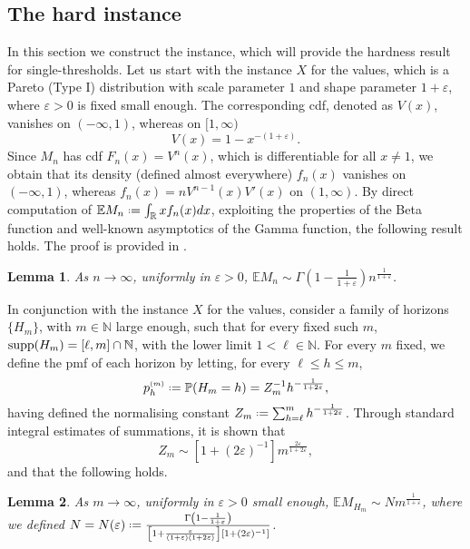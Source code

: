 \documentclass[11pt, a4paper, twoside]{article}
\newcommand*{\defeq}{\mathrel{\vcenter{\baselineskip0.5ex \lineskiplimit0pt
			\hbox{\scriptsize.}\hbox{\scriptsize.}}}=}
\newcommand{\ssup}[1]{{\scriptscriptstyle{({#1})}}}
\newcommand{\eps}{\varepsilon}
\newcommand{\NN}{\mathbb{N}}
\newcommand{\RR}{\mathbb{R}}
\newcommand{\EE}{\mathbb{E}}
\newcommand{\PP}{\mathbb{P}}
\newtheorem{lemma}{Lemma}[section]
\numberwithin{equation}{section}
\begin{document}
	\subsection{The hard instance}
	In this section we construct the instance, which will provide the hardness result for single-thresholds.
	Let us start with the instance $X$ for the values, which is a Pareto (Type I) distribution with scale parameter $1$ and shape parameter $1+\eps$, where $\eps>0$ is fixed small enough. The corresponding cdf, denoted as $V(x)$, vanishes on $(-\infty,1)$, whereas on $[1,\infty)$
	\begin{equation}\label{hardval}
		V(x)= 1-x^{-(1+\eps)}.
	\end{equation}
	Since $M_n$ has cdf $F_n(x)=V^n(x)$, which is differentiable for all $x\neq 1$, we obtain that its density (defined almost everywhere) $f_n(x)$ vanishes on $(-\infty,1)$, whereas $f_n(x)=nV^{n-1}(x)V'(x)$ on $(1,\infty)$. By direct computation of $\EE M_n \defeq \int_\RR xf_n(x)dx$, exploiting the properties of the Beta function and well-known asymptotics of the Gamma function, the following result holds. The proof is provided in .
	\begin{lemma}\label{asympmax}
		As $n\longrightarrow\infty$, uniformly in $\eps>0$,
		$\EE M_n \sim \Gamma\left(1-\frac{1}{1+\eps}\right)n^{\frac{1}{1+\eps}}$.
	\end{lemma}
In conjunction with the instance $X$ for the values, consider a family of horizons $\{H_m\}$, with $m\in\NN$ large enough, such that for every fixed such $m$, $\supp(H_m)=[\ell,m]\cap\NN$, with the lower limit $1<\ell\in\NN$. For every $m$ fixed, we define the pmf of each horizon by letting, for every $\ell\le h\le m$,
	\begin{equation}\label{hardhorizon}
		p_h^\ssup{m}\defeq \PP(H_m=h)=Z_m^{-1}h^{-\frac{1}{1+2\eps}},
	\end{equation}
	having defined the normalising constant $Z_m\defeq\sum_{h=\ell}^m h^{-\frac{1}{1+2\eps}}$. Through standard integral estimates of summations, it is shown that 
	\begin{equation}\label{asympnorm}
		Z_m\sim [1+(2\eps)^{-1}]m^{\frac{2\eps}{1+2\eps}},
	\end{equation} 
	and that the following holds.
	\begin{lemma}\label{asympmax_H_m}
		As $m\longrightarrow\infty$, uniformly in $\eps>0$ small enough, $\EE M_{H_m}\sim N m^{\frac{1}{1+\eps}}$, where we defined
		$N=N(\eps)\defeq\frac{\Gamma\left(1-\frac{1}{1+\eps}\right)}{\left[1+\frac{\eps}{(1+\eps)(1+2\eps)}\right][1+(2\eps)^{-1}]}$.
	\end{lemma}
\end{document}
